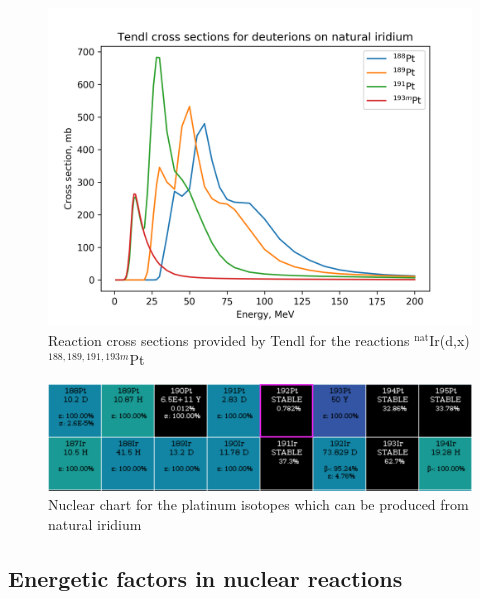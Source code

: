 \documentclass[a4paper,11pt,twoside]{book}
\begin{document}
\begin{figure}
    \centering
    \includegraphics{Theory/reactionchannels_pt.png}
    \caption{Reaction cross sections provided by Tendl for the reactions $^\text{nat}$Ir(d,x)$^{188,189,191,193m}$Pt}
    \label{fig:pt_reactionchannels}
\end{figure}

\begin{figure}
    \centering
    \includegraphics[width=12cm]{Theory/Ir(d)Pt.png}
    \caption{Nuclear chart for the platinum isotopes which can be produced from natural iridium }
    \label{fig:chart_irpt}
\end{figure}



\subsection{Energetic factors in nuclear reactions}
\end{document}
